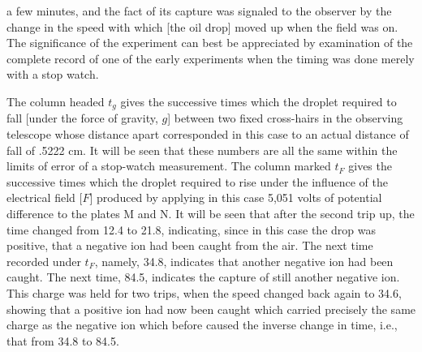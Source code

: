 %
a few minutes, and the fact of its capture was signaled to the observer
by the change in the speed with which {[}the oil drop{]} moved up when
the field was on. The significance of the experiment can best be
appreciated by examination of the complete record of one of the early
experiments when the timing was done merely with a stop watch.

The column headed $t_g$ gives the successive times which the droplet
required to fall [under the force of gravity, $g$] between two fixed cross-hairs in the observing
telescope whose distance apart corresponded in this case to an actual
distance of fall of .5222 cm. It will be seen that these numbers are all
the same within the limits of error of a stop-watch measurement. The
column marked $t_F$ gives the successive times which the droplet
required to rise under the influence of the electrical field [$F$] produced by
applying in this case 5,051 volts of potential difference to the plates
M and N. It will be seen that after the second trip up, the time changed
from 12.4 to 21.8, indicating, since in this case the drop was positive,
that a negative ion had been caught from the air. The next time recorded
under $t_F$, namely, 34.8, indicates that another negative ion had
been caught. The next time, 84.5, indicates the capture of still another
negative ion. This charge was held for two trips, when the speed changed
back again to 34.6, showing that a positive ion had now been caught
which carried precisely the same charge as the negative ion which before
caused the inverse change in time, i.e., that from 34.8 to 84.5.

